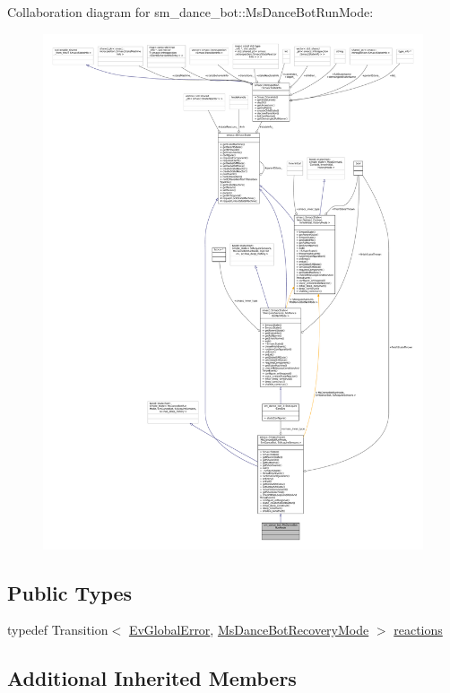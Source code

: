 Collaboration diagram for sm\+\_\+dance\+\_\+bot\+:\+:Ms\+Dance\+Bot\+Run\+Mode\+:
\nopagebreak
\begin{figure}[H]
\begin{center}
\leavevmode
\includegraphics[width=350pt]{classsm__dance__bot_1_1MsDanceBotRunMode__coll__graph}
\end{center}
\end{figure}
\subsection*{Public Types}
\begin{DoxyCompactItemize}
\item 
typedef Transition$<$ \hyperlink{structsm__dance__bot_1_1EvGlobalError}{Ev\+Global\+Error}, \hyperlink{classsm__dance__bot_1_1MsDanceBotRecoveryMode}{Ms\+Dance\+Bot\+Recovery\+Mode} $>$ \hyperlink{classsm__dance__bot_1_1MsDanceBotRunMode_a719e14916aaff2ff6482b666f55027b7}{reactions}
\end{DoxyCompactItemize}
\subsection*{Additional Inherited Members}


